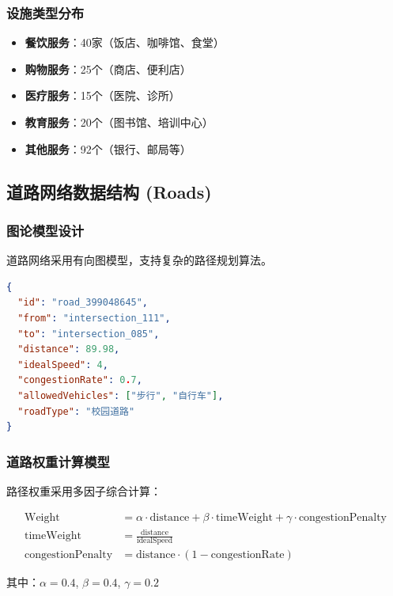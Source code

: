 \documentclass[12pt,a4paper]{article}
\begin{document}
\subsubsection{设施类型分布}
\begin{itemize}
    \item \textbf{餐饮服务}：40家（饭店、咖啡馆、食堂）
    \item \textbf{购物服务}：25个（商店、便利店）
    \item \textbf{医疗服务}：15个（医院、诊所）
    \item \textbf{教育服务}：20个（图书馆、培训中心）
    \item \textbf{其他服务}：92个（银行、邮局等）
\end{itemize}

\subsection{道路网络数据结构 (Roads)}

\subsubsection{图论模型设计}
道路网络采用有向图模型，支持复杂的路径规划算法。

\begin{lstlisting}[language=json, caption={道路数据结构示例}]
{
  "id": "road_399048645",
  "from": "intersection_111",
  "to": "intersection_085",
  "distance": 89.98,
  "idealSpeed": 4,
  "congestionRate": 0.7,
  "allowedVehicles": ["步行", "自行车"],
  "roadType": "校园道路"
}
\end{lstlisting}

\subsubsection{道路权重计算模型}
路径权重采用多因子综合计算：

\begin{align}
\text{Weight} &= \alpha \cdot \text{distance} + \beta \cdot \text{timeWeight} + \gamma \cdot \text{congestionPenalty} \\
\text{timeWeight} &= \frac{\text{distance}}{\text{idealSpeed}} \\
\text{congestionPenalty} &= \text{distance} \cdot (1 - \text{congestionRate})
\end{align}

其中：$\alpha = 0.4$, $\beta = 0.4$, $\gamma = 0.2$
\end{document}
